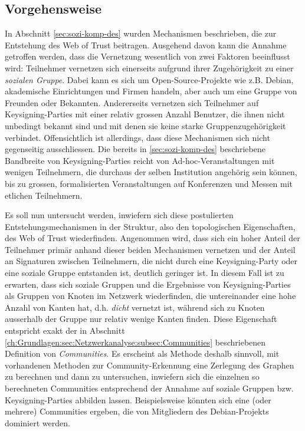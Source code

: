 \subsection{Vorgehensweise}
\label{sec:vorgehensweise}

In Abschnitt \ref{sec:sozi-komp-des} wurden Mechanismen beschrieben,
die zur Entstehung des Web of Trust beitragen. Ausgehend davon kann
die Annahme getroffen werden, dass die Vernetzung wesentlich von zwei
Faktoren beeinflusst wird: Teilnehmer vernetzen sich einerseits
aufgrund ihrer Zugeh\"origkeit zu einer \emph{sozialen Gruppe}. Dabei
kann es sich um Open-Source-Projekte wie z.B. Debian, akademische
Einrichtungen und Firmen handeln, aber auch um eine Gruppe von
Freunden oder Bekannten. Andererseits vernetzen sich Teilnehmer auf
Keysigning-Parties mit einer relativ grossen Anzahl Benutzer, die
ihnen nicht unbedingt bekannt sind und mit denen sie keine starke
Gruppenzugeh\"origkeit verbindet. Offensichtlich ist allerdings, dass
diese Mechanismen sich nicht gegenseitig ausschliessen. Die bereits in
\ref{sec:sozi-komp-des} beschriebene Bandbreite von Keysigning-Parties
reicht von Ad-hoc-Veranstaltungen mit wenigen Teilnehmern, die
durchaus der selben Institution angeh\"orig sein k\"onnen, bis zu
grossen, formalisierten Veranstaltungen auf Konferenzen und Messen mit
etlichen Teilnehmern.

Es soll nun untersucht werden, inwiefern sich diese postulierten
Entstehungsmechanismen in der Struktur, also den topologischen
Eigenschaften, des Web of Trust wiederfinden. Angenommen wird, dass
sich ein hoher Anteil der Teilnehmer prim\"ar anhand dieser beiden
Mechanismen vernetzen und der Anteil an Signaturen zwischen
Teilnehmern, die nicht durch eine Keysigning-Party oder eine soziale
Gruppe entstanden ist, deutlich geringer ist. In diesem Fall ist zu
erwarten, dass sich soziale Gruppen und die Ergebnisse von
Keysigning-Parties als Gruppen von Knoten im Netzwerk wiederfinden,
die untereinander eine hohe Anzahl von Kanten hat, d.h. \emph{dicht}
vernetzt ist, w\"ahrend sich zu Knoten ausserhalb der Gruppe nur
relativ wenige Kanten finden. Diese Eigenschaft entspricht exakt der
in Abschnitt
\ref{ch:Grundlagen:sec:Netzwerkanalyse:subsec:Communities}
beschriebenen Definition von \emph{Communities}. Es erscheint als
Methode deshalb sinnvoll, mit vorhandenen Methoden zur
Community-Erkennung eine Zerlegung des Graphen zu berechnen und dann
zu untersuchen, inwiefern sich die einzelnen so berechneten
Communities entsprechend der Annahme auf soziale Gruppen
bzw. Keysigning-Parties abbilden lassen. Beispielsweise k\"onnten sich
eine (oder mehrere) Communities ergeben, die von Mitgliedern des
Debian-Projekts dominiert werden.

